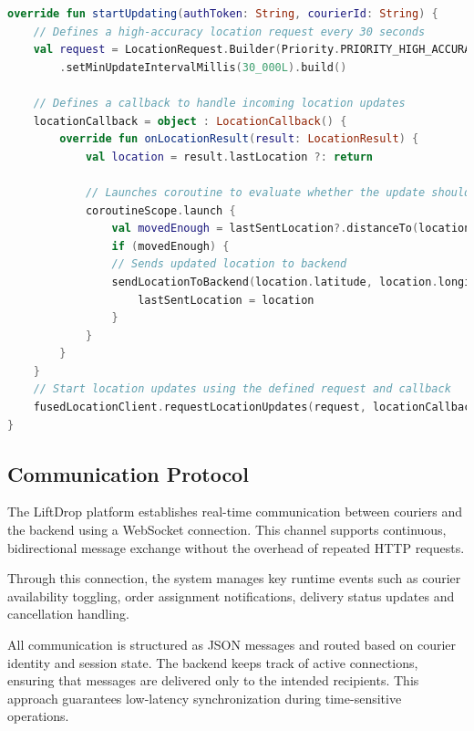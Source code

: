 \begin{lstlisting}[language=Kotlin, caption={Condensed Kotlin-style pseudocode for Courier location updates mechanism}]
override fun startUpdating(authToken: String, courierId: String) {
    // Defines a high-accuracy location request every 30 seconds
    val request = LocationRequest.Builder(Priority.PRIORITY_HIGH_ACCURACY, 30_000L)
        .setMinUpdateIntervalMillis(30_000L).build()

    // Defines a callback to handle incoming location updates
    locationCallback = object : LocationCallback() {
        override fun onLocationResult(result: LocationResult) {
            val location = result.lastLocation ?: return

            // Launches coroutine to evaluate whether the update should be sent or not
            coroutineScope.launch {
                val movedEnough = lastSentLocation?.distanceTo(location)?.let { it > MIN_DISTANCE_METERS } != false
                if (movedEnough) {
                // Sends updated location to backend
                sendLocationToBackend(location.latitude, location.longitude, courierId, authToken)
                    lastSentLocation = location
                }
            }
        }
    }
    // Start location updates using the defined request and callback
    fusedLocationClient.requestLocationUpdates(request, locationCallback!!, Looper.getMainLooper())
}
\end{lstlisting}



\subsection{Communication Protocol}

The LiftDrop platform establishes real-time communication between couriers and the backend using a WebSocket connection. This channel supports continuous, bidirectional message exchange without the overhead of repeated HTTP requests.

Through this connection, the system manages key runtime events such as courier availability toggling, order assignment notifications, delivery status updates and cancellation handling.

All communication is structured as JSON messages and routed based on courier identity and session state. The backend keeps track of active connections, ensuring that messages are delivered only to the intended recipients. This approach guarantees low-latency synchronization during time-sensitive operations.

